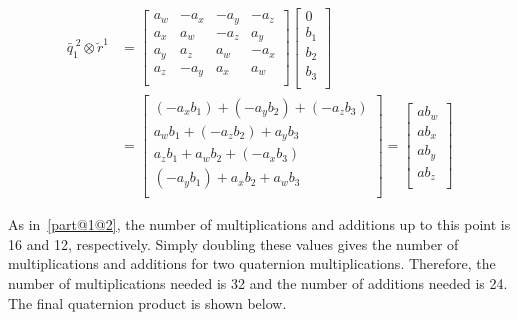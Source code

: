 \begin{parts}
    \begin{equation*}
        \begin{split}
            \bar{q}_1^{\;2} \otimes \breve{r}^1 & =
            \begin{bmatrix}
                a_w & - a_x & - a_y & -a_z  \\
                a_x & a_w   & - a_z & a_y   \\
                a_y & a_z   & a_w   & - a_x \\
                a_z & -a_y  & a_x   & a_w   \\
            \end{bmatrix}
            \begin{bmatrix}
                0   \\
                b_1 \\
                b_2 \\
                b_3 \\
            \end{bmatrix} \\
            & =
            \begin{bmatrix}
                (-a_xb_1) + (-a_yb_2) + (-a_zb_3) \\
                a_wb_1 + (-a_zb_2) + a_yb_3       \\
                a_zb_1 + a_wb_2 + (-a_xb_3)       \\
                (-a_yb_1) + a_xb_2 + a_wb_3       \\
            \end{bmatrix}
            =
            \begin{bmatrix}
                ab_w \\
                ab_x \\
                ab_y \\
                ab_z \\
            \end{bmatrix}
        \end{split}
    \end{equation*}

    As in~\ref{part@1@2}, the number of multiplications and additions up to this point is 16 and 12, respectively. Simply doubling these values gives the number of multiplications and additions for two quaternion multiplications. Therefore, the number of multiplications needed is 32 and the number of additions needed is 24. The final quaternion product is shown below.


\end{parts}
